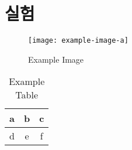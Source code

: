 \section{실험}
\begin{figure}[htbp]
	\centering
	\texttt{[image: example-image-a]}
	\caption{Example Image}
\end{figure}
\begin{table}[htbp]
	\centering
	\caption{Example Table}
	\begin{tabular}{|c|c|c|}
		\hline
		a & b & c \\\hline
		d & e & f \\\hline
	\end{tabular}
\end{table}
